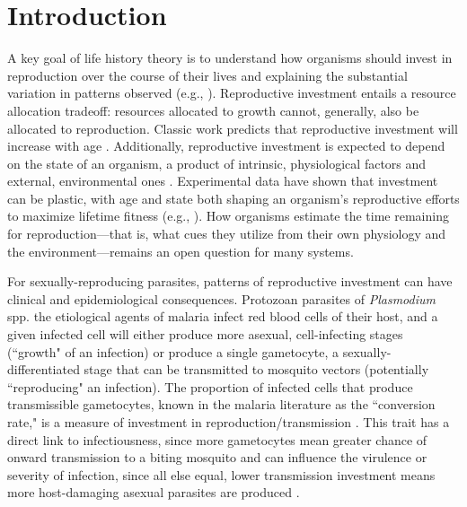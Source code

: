 \documentclass[10pt,letterpaper]{article}
\begin{document}
\section*{Introduction}
A key goal of life history theory is to understand how organisms should invest in reproduction over the course of their lives and explaining the substantial variation in patterns observed (e.g., \cite{jones_diversity_2014}). Reproductive investment entails a resource allocation tradeoff: resources allocated to growth cannot, generally, also be allocated to reproduction. Classic work predicts that reproductive investment will increase with age \cite{gadgil_life_1970, clutton-brock_maternal_1984}. Additionally, reproductive investment is expected to depend on the state of an organism, a product of intrinsic, physiological factors and external, environmental ones \cite{mcnamara_state-dependent_1996}. Experimental data have shown that investment can be plastic, with age and state both shaping an organism's reproductive efforts to maximize lifetime fitness (e.g., \cite{cotter_age-specific_2011,velando_senescent_2006}). How organisms estimate the time remaining for reproduction---that is, what cues they utilize from their own physiology and the environment---remains an open question for many systems.\newline

For sexually-reproducing parasites, patterns of reproductive investment can have clinical and epidemiological consequences. Protozoan parasites of \emph{Plasmodium} spp. \textemdash the etiological agents of malaria \textemdash infect red blood cells of their host, and a given infected cell will either produce more asexual, cell-infecting stages (``growth" of an infection) or produce a single gametocyte, a sexually-differentiated stage that can be transmitted to mosquito vectors (potentially ``reproducing" an infection). The proportion of infected cells that produce transmissible gametocytes, known in the malaria literature as the ``conversion rate," is a measure of investment in reproduction/transmission \cite{carter_stress_2013}. This trait has a direct link to infectiousness, since more gametocytes mean greater chance of onward transmission to a biting mosquito \cite{churcher_predicting_2013,bell_enhanced_2012, huijben_chemotherapy_2010} and can influence the virulence or severity of infection, since all else equal, lower transmission investment means more host-damaging asexual parasites are produced \cite{carter_stress_2013}. \newline 
\end{document}
